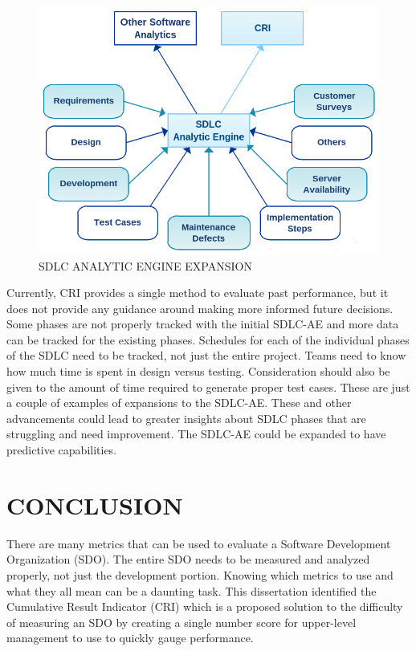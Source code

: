 \documentclass[SDSUThesis.tex]{subfiles}
\begin{document}
    \begin{figure}[ht]
    \includegraphics[scale=.75]{images/sdlcae-adv.png}
    \caption{SDLC ANALYTIC ENGINE EXPANSION}
    \label{fig:sdlc-ae-adv}
    \end{figure}
    
    Currently, CRI provides a single method to evaluate past 
    performance, but it does not
    provide any guidance around making more informed future decisions. 
    Some phases are not properly tracked with the initial SDLC-AE and more
    data can be tracked for the existing phases.
    Schedules for each of the individual phases of the SDLC need to be tracked,
    not just the entire project.  Teams need to know how much time is spent
    in design versus testing.  Consideration should also be given to the amount
    of time required to generate
    proper test cases.  These are just a couple of examples of expansions
    to the SDLC-AE.  These and other advancements could lead to greater
    insights about SDLC phases that are struggling and need improvement.
    The SDLC-AE could be expanded to have predictive capabilities.


\section{CONCLUSION}

    There are many metrics that can be used to evaluate a Software
    Development Organization (SDO). The entire SDO needs to be measured 
    and analyzed properly, not just the development portion. 
    Knowing which metrics to use and what they all mean can be a daunting task.  
    This dissertation identified the Cumulative Result Indicator (CRI) which is a
    proposed solution to the difficulty of measuring an SDO by creating a
    single number score for upper-level management to use to quickly gauge
    performance. 
    
\end{document}
